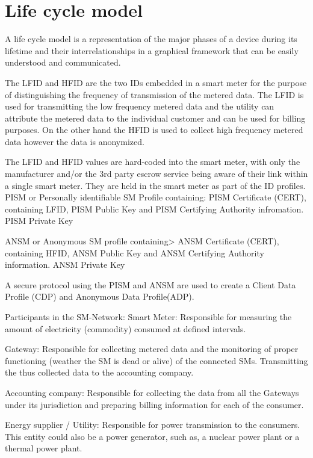 \chapter{Life cycle model}

A life cycle model is a representation of the major phases of a device during its lifetime and their interrelationships in a graphical framework that can be easily understood and communicated. 

The LFID and HFID are the two IDs embedded in a smart meter for the purpose of  distinguishing the frequency of transmission of the metered data. The LFID is used for transmitting the low frequency metered data and the utility can attribute the metered data to the individual customer and can be used for billing purposes. On the other hand the HFID is used to collect high frequency metered data however the data is anonymized.

The LFID and HFID values  are hard-coded into the smart meter, with only the manufacturer and/or the 3rd party escrow service being aware of their link within a single smart meter. They are held in the smart meter as part of the ID profiles.
PISM or Personally identifiable SM Profile containing:
PISM Certificate (CERT), containing LFID, PISM Public Key and PISM Certifying Authority infromation.
PISM Private Key


ANSM or Anonymous SM profile containing>
ANSM Certificate (CERT), containing HFID, ANSM Public Key and ANSM Certifying Authority information.
ANSM Private Key


A secure protocol using the PISM and ANSM are used to create a Client Data Profile (CDP) and Anonymous Data Profile(ADP). 


Participants in the SM-Network:
Smart Meter: Responsible for measuring the amount of electricity (commodity) consumed at defined intervals.

Gateway: Responsible for collecting metered data and the monitoring of proper functioning (weather the SM is dead or alive) of the connected SMs. Transmitting the thus collected data to the accounting company.

Accounting company: Responsible for collecting the data from all the Gateways under its jurisdiction and preparing billing information for each of the consumer.

Energy supplier / Utility: Responsible for power transmission to the consumers. This entity could also be a power generator, such as, a nuclear power plant or a thermal power plant. 

